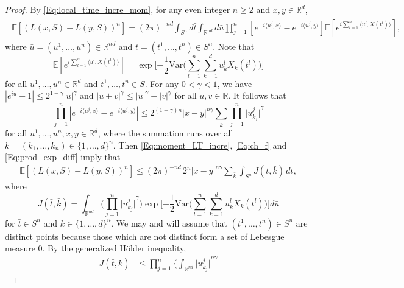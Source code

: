 \documentclass[11pt, reqno]{amsart}
\def\R{{\mathbb R}}
\def\E{{\mathbb E}}
\numberwithin{equation}{section}
\begin{document}
\begin{proof}
By \eqref{Eq:local_time_incre_mom}, for any even integer $n \ge 2$ and $x, y \in \R^d$,
\begin{align}\label{Eq:moment_LT_incre}
\begin{aligned}
\E[(L(x, S) - L(y, S))^n]
= (2\pi)^{-nd} \int_{S^n} d\bar{t} \int_{\R^{nd}} d\bar{u} 
\prod_{j=1}^n \left[e^{-i\langle u^j, x\rangle} - e^{-i\langle u^j, y\rangle}\right] \E\left[e^{i\sum_{l=1}^n\langle u^l, X(t^l)\rangle}\right],
\end{aligned}
\end{align}
where $\bar{u} = (u^1, \dots, u^n) \in \R^{nd}$ and $\bar{t} = (t^1, \dots, t^n) \in S^n$.
Note that
\begin{equation}\label{Eq:ch_f}
\E\left[e^{i\sum_{l=1}^n\langle u^l, X(t^l)\rangle}\right] = \exp\Bigg[{-\frac{1}{2}\mathrm{Var}\Bigg(\sum_{l=1}^n
\sum_{k=1}^d u_k^l X_k(t^l)\Bigg)}\Bigg]
\end{equation}
for all $u^1, \dots, u^n \in \R^d$ and $t^1, \dots, t^n \in S$.
For any $0 < \gamma < 1$, we have $|e^{iu}-1| \le 2^{1-\gamma} |u|^\gamma$
and $|u+v|^\gamma \le |u|^\gamma + |v|^\gamma$ for all $u, v \in \R$.
It follows that
\begin{equation}\label{Eq:prod_exp_diff}
\prod_{j=1}^n \left| e^{-i\langle u^j, x\rangle} - e^{-i\langle u^j, y\rangle} \right| 
\le 2^{(1-\gamma)n} |x-y|^{n\gamma} \sum_{\bar{k}} \prod_{j=1}^n {\big|u_{k_j}^j\big|}^\gamma
\end{equation}
for all $u^1, \dots, u^n, x, y \in \R^d$, where the summation runs over all 
$\bar{k} = (k_1, \dots, k_n) \in \{1, \dots, d\}^n$.
Then \eqref{Eq:moment_LT_incre}, \eqref{Eq:ch_f} and \eqref{Eq:prod_exp_diff} imply that
\begin{align}\label{Eq:Bd_LT_incre}
\E[(L(x, S) - L(y, S))^n] \le (2\pi)^{-nd}\, 2^n |x-y|^{n\gamma} \sum_{\bar{k}}\int_{S^n} J(\bar{t}, \bar{k})\,d\bar{t},
\end{align}
where 
\[ J(\bar{t}, \bar{k}) =  \int_{\R^{nd}} \Bigg( \prod_{j=1}^n {\big|u_{k_j}^j\big|}^\gamma \Bigg)
 \exp\Bigg[{-\frac{1}{2}\mathrm{Var}\Bigg(\sum_{l=1}^n\sum_{k=1}^d u_k^l X_k(t^l)\Bigg)}\Bigg] d\bar{u} \]
for $\bar{t} \in S^n$ and $\bar{k} \in \{1, \dots, d\}^n$. 
We may and will assume that $(t^1, \dots, t^n) \in S^n$ are distinct points because those which are not distinct form 
a set of Lebesgue measure 0. By the generalized H\"{o}lder inequality,
\begin{align*}
J(\bar{t}, \bar{k})
& \le \prod_{j=1}^n \Bigg\{ \int_{\R^{nd}} {\big|u_{k_j}^j\big|}^{n\gamma} 

\end{align*}
\end{proof}
\end{document}
